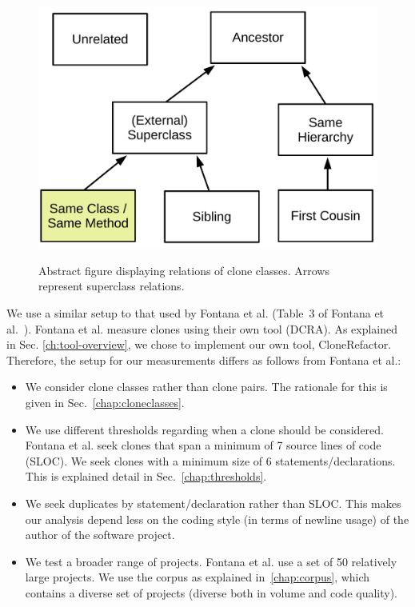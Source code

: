 \documentclass[a4paper]{article}
\begin{document}
\begin{figure}[H]
  \caption{Abstract figure displaying relations of clone classes. Arrows represent superclass relations.}
    \medskip
    \includegraphics[width=1\columnwidth]{img/Relation}
  \label{fig:clonerelation}
\end{figure}

We use a similar setup to that used by Fontana et al. (Table~3 of Fontana et al.~\cite{fontana2015duplicated}). Fontana et al. measure clones using their own tool (DCRA). As explained in Sec. \ref{ch:tool-overview}, we chose to implement our own tool, CloneRefactor. Therefore, the setup for our measurements differs as follows from Fontana et al.:
\begin{itemize}
  \item We consider clone classes rather than clone pairs. The rationale for this is given in Sec.~\ref{chap:cloneclasses}.
\item We use different thresholds regarding when a clone should be considered. Fontana et al. seek clones that span a minimum of 7 source lines of code (SLOC). We seek clones with a minimum size of 6 statements/declarations. This is explained detail in Sec.~\ref{chap:thresholds}.
\item We seek duplicates by statement/declaration rather than SLOC. This makes our analysis depend less on the coding style (in terms of newline usage) of the author of the software project.
\item We test a broader range of projects. Fontana et al. use a set of 50 relatively large projects. We use the corpus as explained in~\ref{chap:corpus}, which contains a diverse set of projects (diverse both in volume and code quality).
\end{itemize}
\end{document}
